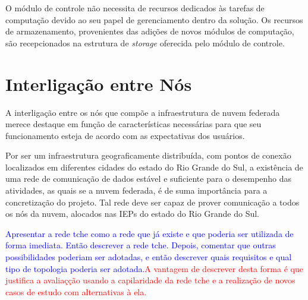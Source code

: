 \documentclass[tese,capa]{texufpel}
\begin{document}
O módulo de controle não necessita de recursos dedicados às tarefas de computação devido ao seu papel de gerenciamento dentro da solução. Os recursos de armazenamento, provenientes das adições de novos módulos de computação, são recepcionados na estrutura de \emph{storage} oferecida pelo módulo de controle.




\section{Interligação entre Nós}\label{sec:rede}

A interligação entre os nós que compõe a infraestrutura de nuvem federada merece destaque em função de características  necessárias para que seu funcionamento esteja de acordo com as expectativas dos usuários.

Por ser um infraestrutura geograficamente distribuída, com pontos de conexão localizados em diferentes cidades do estado do Rio Grande do Sul, a existência de uma rede de comunicação de dados estável e suficiente para o desempenho das atividades, as quais se a nuvem federada, é de suma importância para a concretização do projeto. Tal rede deve ser capaz de prover comunicação a todos os nós da nuvem, alocados nas IEPs do estado do Rio Grande do Sul.

\textcolor{blue}{Apresentar a rede tche como a rede que já existe e que poderia ser utilizada de forma imediata. Então descrever a rede tche. Depois, comentar que outras possibilidades poderiam ser adotadas, e então descrever quais requisitos e qual tipo de topologia poderia ser adotada.}\textcolor{red}{A vantagem de descrever desta forma é que justifica a avaliaçção usando a capilaridade da rede tche e a realização de novos casos de estudo com alternativas à ela.}
\end{document}

